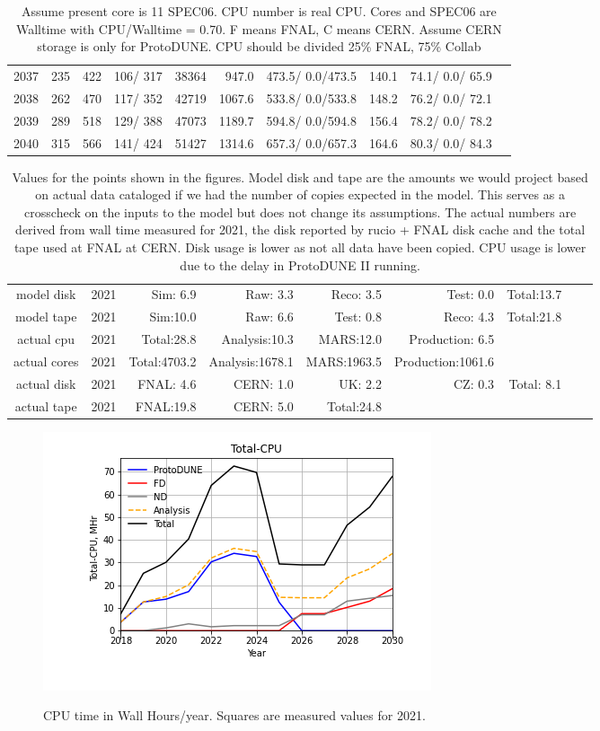 \documentclass[12pt]{article}
\begin{document}
\begin{table}
\begin{tabular}[h]{crrrrrcccc}
2037&	 235&	 422&	 106/ 317&	 38364&	    947.0&	 473.5/  0.0/473.5&	    140.1&	  74.1/  0.0/ 65.9\\
2038&	 262&	 470&	 117/ 352&	 42719&	   1067.6&	 533.8/  0.0/533.8&	    148.2&	  76.2/  0.0/ 72.1\\
2039&	 289&	 518&	 129/ 388&	 47073&	   1189.7&	 594.8/  0.0/594.8&	    156.4&	  78.2/  0.0/ 78.2\\
2040&	 315&	 566&	 141/ 424&	 51427&	   1314.6&	 657.3/  0.0/657.3&	    164.6&	  80.3/  0.0/ 84.3\\
\end{tabular}
\caption{Assume present core is   11 SPEC06. CPU number is real CPU. Cores and SPEC06 are Walltime with CPU/Walltime =  0.70.  F means FNAL, C means CERN. Assume CERN storage is only  for ProtoDUNE. CPU should be divided 25\% FNAL, 75\% Collab}\normalsize
 \end{table}
\begin{table}
\footnotesize
 \centering \begin{tabular}[h]{crrrrrrrr}
          model disk&2021&Sim: 6.9&Raw: 3.3&Reco: 3.5&Test: 0.0&Total:13.7\\
          model tape&2021&Sim:10.0&Raw: 6.6&Test: 0.8&Reco: 4.3&Total:21.8\\
          actual cpu&2021&Total:28.8&Analysis:10.3&MARS:12.0&Production: 6.5\\
        actual cores&2021&Total:4703.2&Analysis:1678.1&MARS:1963.5&Production:1061.6\\
         actual disk&2021&FNAL: 4.6&CERN: 1.0&UK: 2.2&CZ: 0.3&Total: 8.1\\
         actual tape&2021&FNAL:19.8&CERN: 5.0&Total:24.8\\
\end{tabular}
\caption{Values for the points shown in the figures. Model disk and tape are the amounts we would project based on actual data cataloged if we had the number of copies expected in the model. This serves as a crosscheck on the inputs to the model but does not change its assumptions.  The actual numbers are derived from wall time measured for 2021, the disk reported by rucio + FNAL disk cache and the total tape used at FNAL at CERN. Disk usage is lower as not all data have been copied. CPU usage is lower due to the delay in ProtoDUNE II running.}\normalsize
 \end{table}
\pagebreak\begin{figure}
\centering\includegraphics[height=0.4\textwidth]{Total-CPU.png}\label{TotalCPU}
\caption{CPU time in Wall Hours/year. Squares are measured values for 2021.}
\end{figure}
\end{document}
